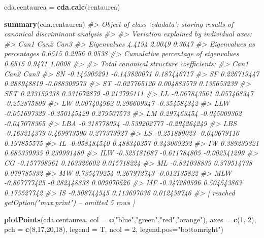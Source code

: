\documentclass[
]{article}
\newenvironment{Shaded}{\begin{snugshade}}{\end{snugshade}}
\newcommand{\CommentTok}[1]{\textcolor[rgb]{0.56,0.35,0.01}{\textit{#1}}}
\newcommand{\DataTypeTok}[1]{\textcolor[rgb]{0.13,0.29,0.53}{#1}}
\newcommand{\DecValTok}[1]{\textcolor[rgb]{0.00,0.00,0.81}{#1}}
\newcommand{\KeywordTok}[1]{\textcolor[rgb]{0.13,0.29,0.53}{\textbf{#1}}}
\newcommand{\NormalTok}[1]{#1}
\newcommand{\StringTok}[1]{\textcolor[rgb]{0.31,0.60,0.02}{#1}}
\begin{document}
\begin{Shaded}
\begin{Highlighting}[]
\NormalTok{cda.centaurea =}\StringTok{ }\KeywordTok{cda.calc}\NormalTok{(centaurea)}

\KeywordTok{summary}\NormalTok{(cda.centaurea)}
\CommentTok{#> Object of class 'cdadata'; storing results of canonical discriminant analysis}
\CommentTok{#> }
\CommentTok{#> Variation explained by individual axes:}
\CommentTok{#>                                        Can1   Can2   Can3}
\CommentTok{#> Eigenvalues                          4.4194 2.0049 0.3647}
\CommentTok{#> Eigenvalues as percentages           0.6515 0.2956 0.0538}
\CommentTok{#> Cumulative percentage of eigenvalues 0.6515 0.9471 1.0008}
\CommentTok{#> }
\CommentTok{#> Total canonical structure coefficients:}
\CommentTok{#>             Can1         Can2         Can3}
\CommentTok{#> SN  -0.145905291 -0.143820071  0.187446717}
\CommentTok{#> SF   0.226719447  0.288948819 -0.088309973}
\CommentTok{#> ST  -0.027765120  0.004883579  0.135653239}
\CommentTok{#> SFT  0.233159338  0.331672879 -0.213795111}
\CommentTok{#> LL  -0.067843561  0.057468347 -0.252875809}
\CommentTok{#> LW   0.007404962  0.296609347 -0.354584342}
\CommentTok{#> LLW -0.051697329 -0.350145429  0.279507573}
\CommentTok{#> LM   0.297463454 -0.045009362 -0.047078365}
\CommentTok{#> LBA -0.318778094 -0.539202777 -0.294264249}
\CommentTok{#> LBS -0.163214379  0.469973590  0.277373927}
\CommentTok{#> LS  -0.251889023 -0.640679116  0.197855575}
\CommentTok{#> IL  -0.058484540  0.488340257  0.343069292}
\CommentTok{#> IW   0.389239321  0.685339935  0.239991480}
\CommentTok{#> ILW -0.525181687 -0.611784805 -0.002541299}
\CommentTok{#> CG  -0.157798961  0.163326602  0.015718224}
\CommentTok{#> ML  -0.831038839  0.379514738  0.079785332}
\CommentTok{#> MW   0.735479254  0.267972743 -0.012135822}
\CommentTok{#> MLW -0.867777425 -0.282448838  0.009070526}
\CommentTok{#> MF  -0.347280596  0.504543863  0.175527742}
\CommentTok{#> IS  -0.508744545  0.113697036  0.012459746}
\CommentTok{#>  [ reached getOption("max.print") -- omitted 5 rows ]}

\KeywordTok{plotPoints}\NormalTok{(cda.centaurea, }\DataTypeTok{col =} \KeywordTok{c}\NormalTok{(}\StringTok{"blue"}\NormalTok{,}\StringTok{"green"}\NormalTok{,}\StringTok{"red"}\NormalTok{,}\StringTok{"orange"}\NormalTok{), }\DataTypeTok{axes =} \KeywordTok{c}\NormalTok{(}\DecValTok{1}\NormalTok{, }\DecValTok{2}\NormalTok{),}
           \DataTypeTok{pch =} \KeywordTok{c}\NormalTok{(}\DecValTok{8}\NormalTok{,}\DecValTok{17}\NormalTok{,}\DecValTok{20}\NormalTok{,}\DecValTok{18}\NormalTok{), }\DataTypeTok{legend =}\NormalTok{ T, }\DataTypeTok{ncol =} \DecValTok{2}\NormalTok{, }\DataTypeTok{legend.pos=}\StringTok{"bottomright"}\NormalTok{)}
\end{Highlighting}
\end{Shaded}
\end{document}
